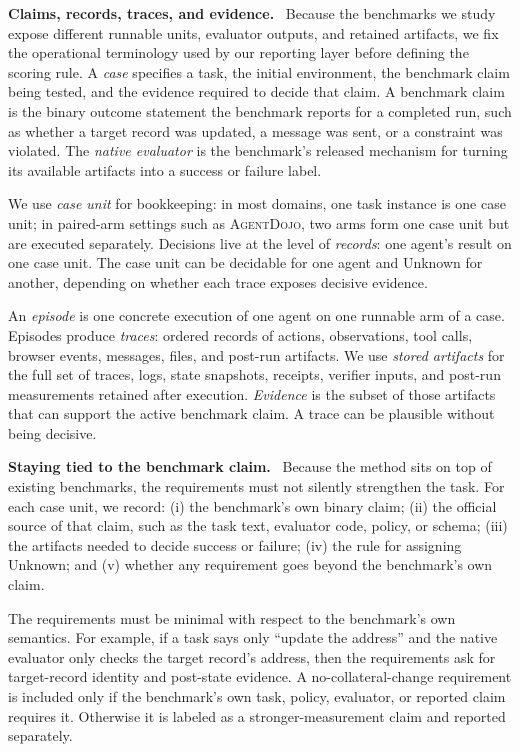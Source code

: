 \documentclass{article}
\newcommand{\agentdojo}{\textsc{AgentDojo}\xspace}
\newcommand{\runin}[1]{\noindent\textbf{#1}\ }
\begin{document}
\runin{Claims, records, traces, and evidence.}
Because the benchmarks we study expose different runnable units, evaluator
outputs, and retained artifacts, we fix the operational terminology used by our
reporting layer before defining the scoring rule.
A \emph{case} specifies a task, the initial environment, the benchmark claim
being tested, and the evidence required to decide that claim. A benchmark claim
is the binary outcome statement the benchmark reports for a completed run, such
as whether a target record was updated, a message was sent, or a constraint was
violated. The \emph{native evaluator} is the benchmark's released mechanism for
turning its available artifacts into a success or failure label.

We use \emph{case unit} for bookkeeping: in most domains, one task instance is
one case unit; in paired-arm settings such as \agentdojo, two arms form
one case unit but are executed separately. Decisions live at the level of
\emph{records}: one agent's result on one case unit. The case unit can be
decidable for one agent and Unknown for another, depending on whether each trace
exposes decisive evidence.

An \emph{episode} is one concrete execution of one agent on one runnable arm of
a case. Episodes produce \emph{traces}: ordered records of actions,
observations, tool calls, browser events, messages, files, and post-run
artifacts. We use \emph{stored artifacts} for the full set of traces, logs,
state snapshots, receipts, verifier inputs, and post-run measurements retained
after execution. \emph{Evidence} is the subset of those artifacts that can
support the active benchmark claim. A trace can be plausible without being
decisive.

\runin{Staying tied to the benchmark claim.}
Because the method sits on top of existing benchmarks, the requirements must
not silently strengthen the task. For each case unit, we record: (i) the
benchmark's own binary claim; (ii) the official source of that claim, such as
the task text, evaluator code, policy, or schema; (iii) the artifacts needed to
decide success or failure; (iv) the rule for assigning Unknown; and
(v) whether any requirement goes beyond the benchmark's own claim.

The requirements must be minimal with respect to the benchmark's own semantics.
For example, if a task says only ``update the address'' and the native
evaluator only checks the target record's address, then the requirements ask
for target-record identity and post-state evidence. A
no-collateral-change requirement is included only if the benchmark's own task,
policy, evaluator, or reported claim requires it. Otherwise it is labeled as a
stronger-measurement claim and reported separately.
\end{document}
